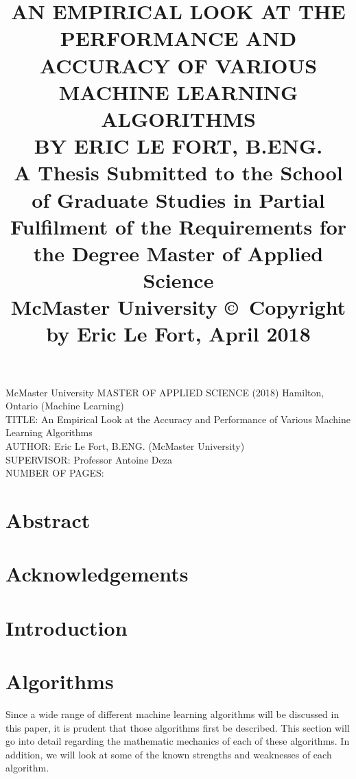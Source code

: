 \documentclass[titlepage]{article}
\title{
	AN EMPIRICAL LOOK AT THE PERFORMANCE AND ACCURACY OF VARIOUS MACHINE LEARNING ALGORITHMS\\[20mm]
	BY ERIC LE FORT, B.ENG.\\[20mm]
	\large A Thesis Submitted to the School of Graduate Studies in Partial Fulfilment of the Requirements for the Degree Master of Applied Science\\[20mm]
	McMaster University \copyright~Copyright by Eric Le Fort, April 2018
}\date{}
\begin{document}
\maketitle\normalsize\setcounter{page}{2}
\noindent McMaster University MASTER OF APPLIED SCIENCE (2018) Hamilton, \mbox{Ontario} (Machine Learning)\\[10mm]
TITLE: An Empirical Look at the Accuracy and Performance of Various \mbox{Machine} Learning Algorithms\\
AUTHOR: Eric Le Fort, B.ENG. (McMaster University)\\
SUPERVISOR: Professor Antoine Deza\\
NUMBER OF PAGES: \pageref{LastPage}%

\newpage
\section{Abstract}%



\newpage
\section{Acknowledgements}%



\newpage
\tableofcontents
\listoftables
\listoffigures



\newpage
\section{Introduction}%



\section{Algorithms}
Since a wide range of different machine learning algorithms will be discussed in this paper, it is prudent that those algorithms first be described. This section will go into detail regarding the mathematic mechanics of each of these algorithms. In addition, we will look at some of the known strengths and weaknesses of each algorithm.
\end{document}
